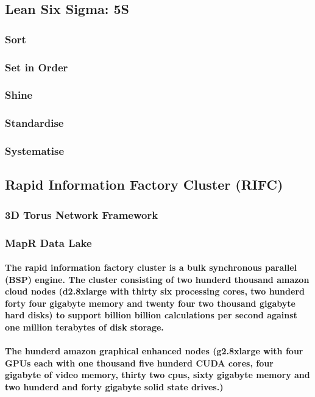 \documentclass{acm_proc_article-sp}
\begin{document}
\subsection{Lean Six Sigma: 5S}
\subsubsection{Sort}
\subsubsection{Set in Order}
\subsubsection{Shine}
\subsubsection{Standardise}
\subsubsection{Systematise}
\newpage
\subsection{Rapid Information Factory Cluster (RIFC)}
\subsubsection{3D Torus Network Framework}
\subsubsection{MapR Data Lake}
\paragraph{The rapid information factory cluster is a bulk synchronous parallel (BSP) engine. The cluster consisting of two hunderd thousand amazon cloud nodes (d2.8xlarge with thirty six processing cores, two hunderd forty four gigabyte memory and twenty four two thousand gigabyte hard disks) to support billion billion calculations per second against one million terabytes of disk storage.}
\paragraph{The hunderd amazon graphical enhanced nodes (g2.8xlarge with four GPUs each with one thousand five hunderd CUDA cores, four gigabyte of video memory, thirty two cpus, sixty gigabyte memory and two hunderd and forty gigabyte solid state drives.)}
\end{document}

